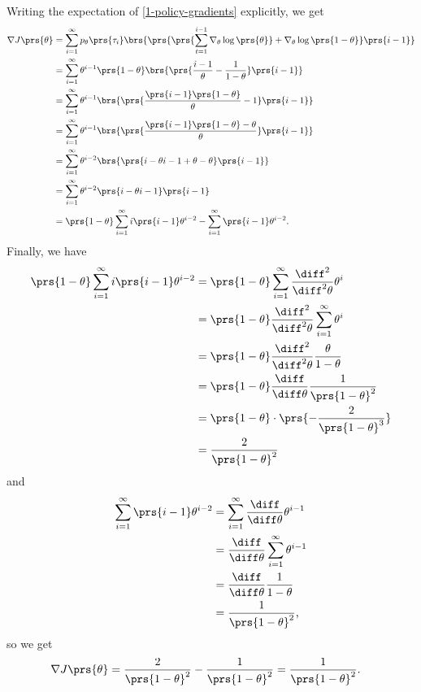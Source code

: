 \documentclass[10pt]{article}
\theoremstyle{definition}
\begin{document}
\begin{enumerate}
\begin{enumerate}[label=(\alph*)]
Writing the expectation of \eqref{1-policy-gradients} explicitly, we get
\begin{align*}
\nabla J\prs{\theta} &= \sum_{i=1}^{\infty} p_\theta\prs{\tau_i} \brs{\prs{\prs{\sum_{t = 1}^{i-1} \nabla_\theta \log\prs{\theta}} + \nabla_\theta \log\prs{1 - \theta}} \prs{i-1}}
\\&= \sum_{i=1}^{\infty} \theta^{i-1} \prs{1 - \theta} \brs{\prs{\frac{i-1}{\theta} - \frac{1}{1-\theta}} \prs{i-1}}
\\&= \sum_{i=1}^{\infty} \theta^{i-1} \brs{\prs{\frac{\prs{i-1}\prs{1 - \theta}}{\theta} - 1} \prs{i-1}}
\\&= \sum_{i=1}^{\infty} \theta^{i-1} \brs{\prs{\frac{\prs{i-1}\prs{1 - \theta} - \theta}{\theta}} \prs{i-1}}
\\&= \sum_{i=1}^{\infty} \theta^{i-2} \brs{\prs{i - \theta i - 1 + \theta - \theta}\prs{i-1}}
\\&= \sum_{i=1}^{\infty} \theta^{i-2} \prs{i-\theta i - 1}\prs{i-1}
\\&= \prs{1-\theta} \sum_{i=1}^{\infty} i \prs{i-1} \theta^{i-2} - \sum_{i=1}^{\infty} \prs{i-1} \theta^{i-2} \text{.}
\end{align*}
Finally, we have
\begin{align*}
\prs{1 - \theta} \sum_{i=1}^{\infty} i \prs{i-1} \theta^{i-2} &=
\prs{1 - \theta} \sum_{i=1}^{\infty} \frac{\diff^2}{\diff^2 \theta} \theta^i
\\&=
\prs{1 - \theta} \frac{\diff^2}{\diff^2 \theta} \sum_{i=1}^{\infty} \theta^i
\\&=
\prs{1 - \theta} \frac{\diff^2}{\diff^2 \theta} \frac{\theta}{1 - \theta}
\\&=
\prs{1 - \theta} \frac{\diff}{\diff \theta} \frac{1}{\prs{1 - \theta}^2}
\\&= \prs{1 - \theta} \cdot \prs{- \frac{2}{\prs{1-\theta}^3}}
\\&= \frac{2}{\prs{1-\theta}^2}
\end{align*}
and
\begin{align*}
\sum_{i=1}^{\infty} \prs{i-1} \theta^{i-2}
&=
\sum_{i=1}^{\infty} \frac{\diff}{\diff \theta} \theta^{i-1}
\\&=
\frac{\diff}{\diff \theta} \sum_{i=1}^{\infty} \theta^{i-1}
\\&=
\frac{\diff}{\diff \theta} \frac{1}{1 - \theta}
\\&= \frac{1}{\prs{1-\theta}^2} \text{,}
\end{align*}
so we get
\begin{align*}
\nabla J\prs{\theta}
&=
\frac{2}{\prs{1-\theta}^2} - \frac{1}{\prs{1-\theta}^2} = \frac{1}{\prs{1 - \theta}^2} \text{.}
\end{align*}


\end{enumerate}
\end{enumerate}
\end{document}
